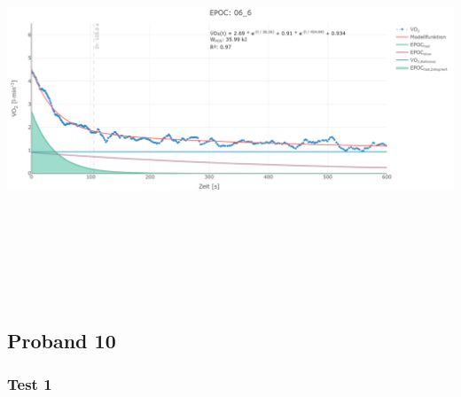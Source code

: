 \documentclass[
  letterpaper,
  DIV=11]{scrartcl}
\begin{document}
\includegraphics[width=11.45833in,height=4.6875in]{images/06_6.png}

\subsection{Proband 10}

\subsubsection{Test 1}
\end{document}
